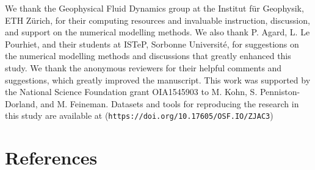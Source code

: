\documentclass[draft,linenumbers]{agujournal2018}
\begin{document}
\clearpage

\acknowledgments

We thank the Geophysical Fluid Dynamics group at the Institut für
Geophysik, ETH Zürich, for their computing resources and invaluable
instruction, discussion, and support on the numerical modelling methods.
We also thank P. Agard, L. Le Pourhiet, and their students at ISTeP,
Sorbonne Université, for suggestions on the numerical modelling methods
and discussions that greatly enhanced this study. We thank the anonymous
reviewers for their helpful comments and suggestions, which greatly
improved the manuscript. This work was supported by the National Science
Foundation grant OIA1545903 to M. Kohn, S. Penniston-Dorland, and M.
Feineman. Datasets and tools for reproducing the research in this study
are available at (\texttt{https://doi.org/10.17605/OSF.IO/ZJAC3})

\newpage

\hypertarget{references}{%
\section*{References}\label{references}}
\end{document}
